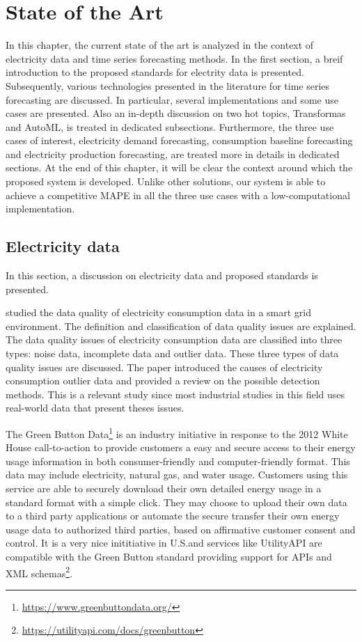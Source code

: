 \chapter{State of the Art}
\label{cha:soa}
\vspace{0.4 cm}

In this chapter, the current state of the art is analyzed in the context of electricity data and time series forecasting methods.
In the first section, a breif introduction to the proposed standards for electrity data is presented.
Subsequently, various technologies presented in the literature for time series forecasting are discussed.
In particular, several implementations and some use cases are presented.
Also an in-depth discussion on two hot topics, Transformas and AutoML, is treated in dedicated subsections.
Furthermore, the three use cases of interest, electricity demand forecasting, consumption baseline forecasting and electricity production forecasting, are treated more in details in dedicated sections.
At the end of this chapter, it will be clear the context around which the proposed system is developed.
Unlike other solutions, our system is able to achieve a competitive MAPE in all the three use cases with a low-computational implementation.


\section{Electricity data}
\label{sec:data}
\vspace{0.2 cm}

In this section, a discussion on electricity data and proposed standards is presented.

\cite{CHEN201798} studied the data quality of electricity consumption data in a smart grid environment.
The definition and classification of data quality issues are explained.
The data quality issues of electricity consumption data are classified into three types: noise data, incomplete data and outlier data.
These three types of data quality issues are discussed.
The paper introduced the causes of electricity consumption outlier data and provided a review on the possible detection methods.
This is a relevant study since most industrial studies in this field uses real-world data that present theses issues.

The Green Button Data\footnote{ \url{https://www.greenbuttondata.org/} } is an industry initiative in response to the 2012 White House call-to-action to provide customers a easy and secure access to their energy usage information in both consumer-friendly and computer-friendly format.
This data may include electricity, natural gas, and water usage.
Customers using this service are able to securely download their own detailed energy usage in a standard format with a simple click.
They may choose to upload their own data to a third party applications or automate the secure transfer their own energy usage data to authorized third parties, based on affirmative customer consent and control.
It is a very nice inititiative in U.S.and services like UtilityAPI are compatible with the Green Button standard providing support for APIs and XML schemas\footnote{ \url{https://utilityapi.com/docs/greenbutton} }.

